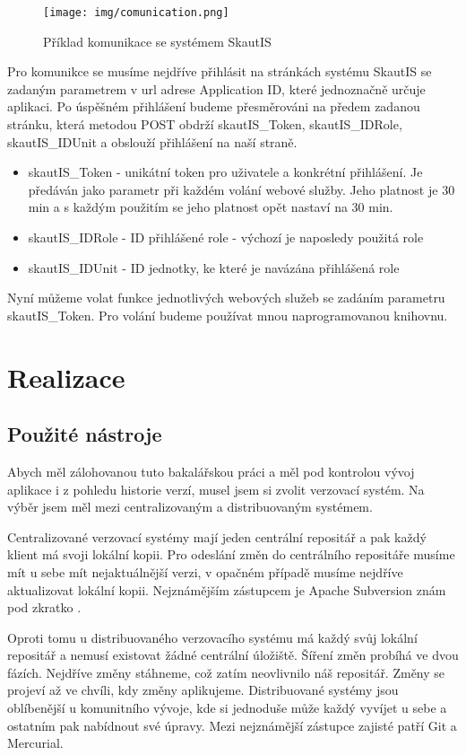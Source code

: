 \documentclass[thesis=B,czech]{FITthesis}[2011/06/14]
\begin{document}
\begin{figure}[h] \centering
 	\texttt{[image: img/comunication.png]}
 	\caption[SkautIS]{Příklad komunikace se systémem SkautIS}\label{fig:comunication-diagram}
\end{figure}

Pro komunikce se musíme nejdříve přihlásit na stránkách systému SkautIS se zadaným parametrem v url adrese Application ID, které jednoznačně určuje aplikaci. Po úspěšném přihlášení budeme přesměrováni na předem zadanou stránku, která metodou POST obdrží skautIS\_Token, skautIS\_IDRole, skautIS\_IDUnit a obslouží přihlášení na naší straně.

\begin{itemize}
	\item skautIS\_Token - unikátní token pro uživatele a konkrétní přihlášení. Je předáván jako parametr při každém volání webové služby. Jeho platnost je 30 min a s každým použitím se jeho platnost opět nastaví na 30 min. 
	\item skautIS\_IDRole - ID přihlášené role - výchozí je naposledy použitá role 
	\item skautIS\_IDUnit - ID jednotky, ke které je navázána přihlášená role 
\end{itemize}

Nyní můžeme volat funkce jednotlivých webových služeb se zadáním parametru skautIS\_Token. Pro volání budeme používat mnou naprogramovanou knihovnu. 

\chapter{Realizace}

\section{Použité nástroje}
Abych měl zálohovanou tuto bakalářskou práci a měl pod kontrolou vývoj aplikace i z pohledu historie verzí, musel jsem si zvolit verzovací systém. Na výběr jsem měl mezi centralizovaným a distribuovaným systémem.

Centralizované verzovací systémy mají jeden centrální repositář a pak každý klient má svoji lokální kopii. Pro odeslání změn do centrálního repositáře musíme mít u sebe mít nejaktuálnější verzi, v opačném případě musíme nejdříve aktualizovat lokální kopii. Nejznámějším zástupcem je Apache Subversion znám pod zkratko .

Oproti tomu u distribuovaného verzovacího systému má každý svůj lokální repositář a nemusí existovat žádné centrální úložiště. Šíření změn probíhá ve dvou fázích. Nejdříve změny stáhneme, což zatím neovlivnilo náš repositář. Změny se projeví až ve chvíli, kdy změny aplikujeme. Distribuované systémy jsou oblíbenější u komunitního vývoje, kde si jednoduše může každý vyvíjet u sebe a ostatním pak nabídnout své úpravy. Mezi nejznámější zástupce zajisté patří Git a Mercurial.
\end{document}
